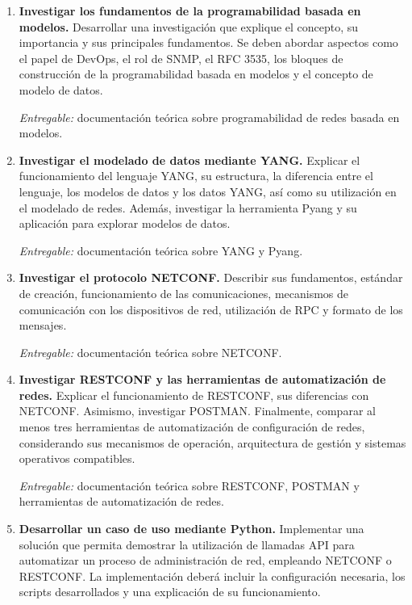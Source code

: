 \documentclass[12pt,a4paper]{article}
\begin{document}
\begin{enumerate}[label=\textbf{M\arabic*.}, leftmargin=*]

    \item \textbf{Investigar los fundamentos de la programabilidad basada en modelos.}
    Desarrollar una investigación que explique el concepto, su importancia y sus principales fundamentos. Se deben abordar aspectos como el papel de DevOps, el rol de SNMP, el RFC 3535, los bloques de construcción de la programabilidad basada en modelos y el concepto de modelo de datos.

    \textit{Entregable:} documentación teórica sobre programabilidad de redes basada en modelos.

    \item \textbf{Investigar el modelado de datos mediante YANG.}
    Explicar el funcionamiento del lenguaje YANG, su estructura, la diferencia entre el lenguaje, los modelos de datos y los datos YANG, así como su utilización en el modelado de redes. Además, investigar la herramienta Pyang y su aplicación para explorar modelos de datos.

    \textit{Entregable:} documentación teórica sobre YANG y Pyang.

    \item \textbf{Investigar el protocolo NETCONF.}
    Describir sus fundamentos, estándar de creación, funcionamiento de las comunicaciones, mecanismos de comunicación con los dispositivos de red, utilización de RPC y formato de los mensajes.

    \textit{Entregable:} documentación teórica sobre NETCONF.

    \item \textbf{Investigar RESTCONF y las herramientas de automatización de redes.}
    Explicar el funcionamiento de RESTCONF, sus diferencias con NETCONF. Asimismo, investigar POSTMAN. Finalmente, comparar al menos tres herramientas de automatización de configuración de redes, considerando sus mecanismos de operación, arquitectura de gestión y sistemas operativos compatibles.

    \textit{Entregable:} documentación teórica sobre RESTCONF, POSTMAN y herramientas de automatización de redes.

    \item \textbf{Desarrollar un caso de uso mediante Python.}
    Implementar una solución que permita demostrar la utilización de llamadas API para automatizar un proceso de administración de red, empleando NETCONF o RESTCONF. La implementación deberá incluir la configuración necesaria, los scripts desarrollados y una explicación de su funcionamiento.


\end{enumerate}
\end{document}
